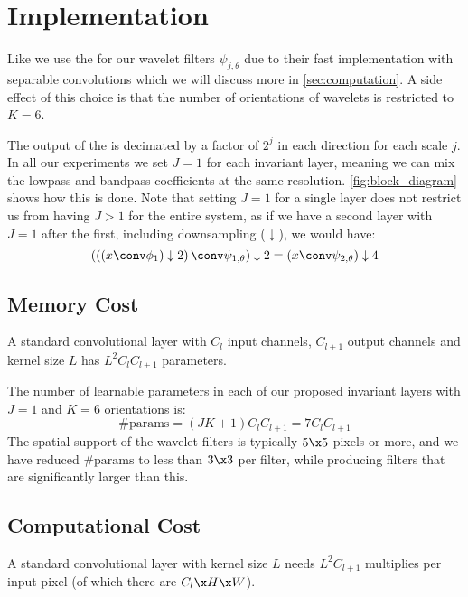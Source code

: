

\section{Implementation}\label{sec:implementation}
Like \cite{singh_dual-tree_2017,singh_multi-resolution_2016} we use the \DTCWT
\cite{selesnick_dual-tree_2005} for our wavelet filters $\psi_{j, \theta}$ due
to their fast implementation with separable convolutions which we will discuss
more in \autoref{sec:computation}.  A side effect of this choice is that the
number of orientations of wavelets is restricted to $K=6$.

The output of the \DTCWT is decimated by a factor of $2^j$ in each direction for
each scale $j$.  In all our experiments we set $J=1$ for each invariant layer,
meaning we can mix the lowpass and bandpass coefficients at the same resolution.
\autoref{fig:block_diagram} shows how this is done. Note that setting $J=1$ for
a single layer does not restrict us from having $J>1$ for the entire system, as
if we have a second layer with $J=1$ after the first, including downsampling
($\downarrow$), we would have:
%
\begin{equation}
  \left(\left(\left(x \conv \phi_1\right) \downarrow 2\right) \conv \psi_{1, \theta}\right) \downarrow 2 = \left(x \conv \psi_{2, \theta}\right) \downarrow 4
\end{equation}

\subsection{Memory Cost}\label{sec:memory}
A standard convolutional layer with $C_l$ input channels, $C_{l+1}$ output channels
and kernel size $L$ has $L^2C_{l}C_{l+1}$ parameters. 

The number of learnable parameters in each of our proposed invariant layers with
$J=1$ and $K=6$ orientations is:
%
\begin{equation}
  \text{\#params} = (JK+1)C_{l}C_{l+1} = 7C_{l}C_{l+1}
\end{equation} 
%
The spatial support of the wavelet filters is typically $5\x 5$ pixels or more,
and we have reduced $\text{\#params}$ to less than $3\x3$ per filter, while
producing filters that are significantly larger than this.

\subsection{Computational Cost}\label{sec:computation}
A standard convolutional layer with kernel size $L$ needs $L^2C_{l+1}$
multiplies per input pixel (of which there are $C_{l}\x H\x W$).

